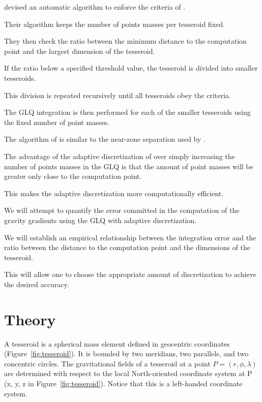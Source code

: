 \documentclass[paper,twocolumn]{geophysics}
\begin{document}
\citet{Li2011} devised an automatic algorithm to enforce the criteria of
\citet{Ku1977}.

Their algorithm keeps the number of points masses per tesseroid fixed.

They then check the ratio between the minimum distance to the computation point
and the largest dimension of the tesseroid.

If the ratio below a specified threshold value, the tesseroid is divided into
smaller tesseroids.

This division is repeated recursively until all tesseroids obey the criteria.

The GLQ integration is then performed for each of the smaller tesseroids
using the fixed number of point masses.

The algorithm of \citet{Li2011} is similar to the near-zone separation used by
\citet{Grombein2013}.

The advantage of the adaptive discretization of \citet{Li2011} over simply
increasing the number of points masses in the GLQ is that the
amount of point masses will be greater only close to the computation point.

This makes the adaptive discretization more computationally efficient.


We will attempt to quantify the error committed in the computation of the
gravity gradients using the GLQ with adaptive discretization.

We will establish an empirical relationship between the integration error and
the ratio between the distance to the computation point and the dimensions of
the tesseroid.

This will allow one to choose the appropriate amount of discretization to
achieve the desired accuracy.


\section{Theory}

A tesseroid is a spherical mass element defined in geocentric coordinates
(Figure~\ref{fig:tesseroid}).
It is bounded by two meridians, two parallels, and two concentric circles.
The gravitational fields of a tesseroid at a point $P = (r,\phi,\lambda)$
are determined with respect to the local North-oriented coordinate system at
P (x, y, z in Figure~\ref{fig:tesseroid}).
Notice that this is a left-handed coordinate system.
\end{document}
